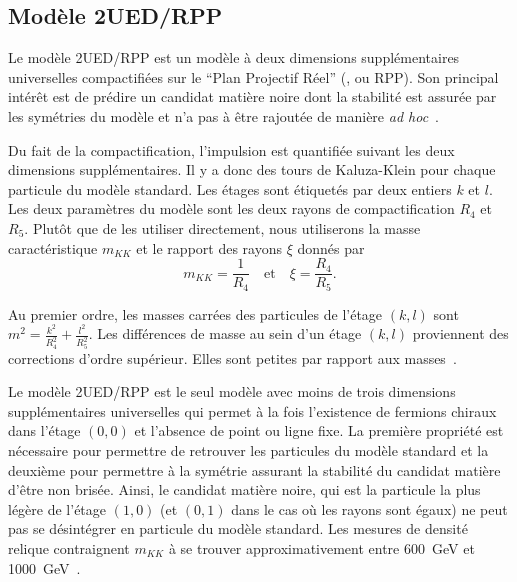 \subsection{Mod\`ele 2UED/RPP}
\label{sec:modele2UED/RPP}

Le modèle 2UED/RPP est un modèle à deux dimensions supplémentaires universelles compactifiées sur le ``Plan Projectif Réel'' (, ou RPP). Son principal intérêt est de prédire un candidat matière noire dont la stabilit\'e est assur\'ee par les sym\'etries du mod\`ele et n'a pas \`a \^etre rajout\'ee de mani\`ere {\it ad hoc}~\cite{Lyon09}.

Du fait de la compactification, l'impulsion est quantifi\'ee suivant les deux dimensions suppl\'ementaires. Il y a donc des tours de Kaluza-Klein pour chaque particule du modèle standard. Les \'etages sont étiquetés par deux entiers $k$ et $l$. Les deux param\`etres du mod\`ele sont les deux rayons de compactification $R_4$ et $R_5$. Plut\^ot que de les utiliser directement, nous utiliserons la masse caract\'eristique $m_{KK}$ et le rapport des rayons $\xi$ donn\'es par
\[m_{KK} = \frac{1}{R_4}\quad\text{et}\quad\xi = \frac{R_4}{R_5}.\]

Au premier ordre, les masses carr\'ees des particules de l'\'etage $(k,l)$ sont $m^2=\frac{k^2}{R_4^2} + \frac{l^2}{R_5^2}$. Les diff\'erences de masse au sein d'un \'etage $(k,l)$ proviennent des corrections d'ordre sup\'erieur. Elles sont petites par rapport aux masses~\cite{Lyon09}.

Le mod\`ele 2UED/RPP est le seul mod\`ele avec moins de trois dimensions suppl\'ementaires universelles qui permet \`a la fois l'existence de fermions chiraux dans l'\'etage $(0,0)$ et l'absence de point ou ligne fixe. La premi\`ere propri\'et\'e est n\'ecessaire pour permettre de retrouver les particules du mod\`ele standard et la deuxi\`eme pour permettre \`a la sym\'etrie assurant la stabilit\'e du candidat mati\`ere d'\^etre non bris\'ee. Ainsi, le candidat mati\`ere noire, qui est la particule la plus l\'eg\`ere de l'\'etage $(1,0)$ (et $(0,1)$ dans le cas o\`u les rayons sont \'egaux) ne peut pas se d\'esint\'egrer en particule du mod\`ele standard. Les mesures de densit\'e relique contraignent $m_{KK}$ \`a se trouver approximativement entre 600~GeV et 1000~GeV~\cite{Lyon12}.

